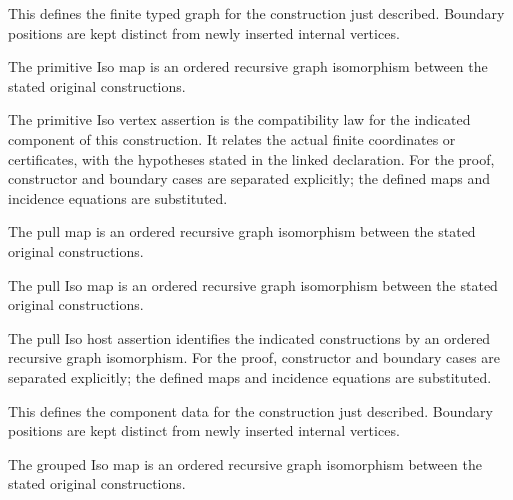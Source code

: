 This defines the finite typed graph for the construction just described. Boundary positions are kept distinct from newly inserted internal vertices.
\par{}

The primitive Iso map is an ordered recursive graph isomorphism between the stated original constructions.
\par{}

The primitive Iso vertex assertion is the compatibility law for the indicated component of this construction. It relates the actual finite coordinates or certificates, with the hypotheses stated in the linked declaration.
For the proof, constructor and boundary cases are separated explicitly; the defined maps and incidence equations are substituted.
\par{}

The pull map is an ordered recursive graph isomorphism between the stated original constructions.
\par{}

The pull Iso map is an ordered recursive graph isomorphism between the stated original constructions.
\par{}

The pull Iso host assertion identifies the indicated constructions by an ordered recursive graph isomorphism.
For the proof, constructor and boundary cases are separated explicitly; the defined maps and incidence equations are substituted.
\par{}

This defines the component data for the construction just described. Boundary positions are kept distinct from newly inserted internal vertices.
\par{}

The grouped Iso map is an ordered recursive graph isomorphism between the stated original constructions.
\par{}

